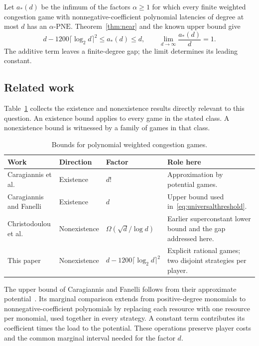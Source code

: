 \documentclass[11pt]{article}
\theoremstyle{definition}
\newcommand{\PNE}{\mathrm{PNE}}
\begin{document}
Let $a_*(d)$ be the infimum of the factors $\alpha\ge1$ for which every finite weighted congestion game with nonnegative-coefficient polynomial latencies of degree at most $d$ has an $\alpha$-$\PNE$. Theorem~\ref{thm:near} and the known upper bound give
\begin{equation}\label{eq:universalthreshold}
 d-1200\lceil\log_2d\rceil^2\le a_*(d)\le d,
 \qquad \lim_{d\to\infty}\frac{a_*(d)}d=1.
\end{equation}
The additive term leaves a finite-degree gap; the limit determines its leading constant.

\subsection{Related work}
Table~\ref{tab:related} collects the existence and nonexistence results directly relevant to this question. An existence bound applies to every game in the stated class. A nonexistence bound is witnessed by a family of games in that class.
\begin{table}[ht]
\centering\small
\caption{Bounds for polynomial weighted congestion games.}\label{tab:related}
\begin{tabularx}{\textwidth}{@{}>{\raggedright\arraybackslash}p{}>{\raggedright\arraybackslash}p{}>{\raggedright\arraybackslash}p{}>{\raggedright\arraybackslash}X@{}}
\toprule
Work & Direction & Factor & Role here\\
\midrule
Caragiannis et al.~\cite{CFGS2015} & Existence & $d!$ & Approximation by potential games.\\
Caragiannis and Fanelli~\cite{CF2021} & Existence & $d$ & Upper bound used in~\eqref{eq:universalthreshold}.\\
Christodoulou et al.~\cite{CGGPW2023} & Nonexistence & $\Omega(\sqrt d/\log d)$ & Earlier superconstant lower bound and the gap addressed here.\\
This paper & Nonexistence & $d-1200\lceil\log_2d\rceil^2$ & Explicit rational games; two disjoint strategies per player.\\
\bottomrule
\end{tabularx}
\end{table}

The upper bound of Caragiannis and Fanelli follows from their approximate potential~\cite[Theorem~2]{CF2021}. Its marginal comparison extends from positive-degree monomials to nonnegative-coefficient polynomials by replacing each resource with one resource per monomial, used together in every strategy. A constant term contributes its coefficient times the load to the potential. These operations preserve player costs and the common marginal interval needed for the factor $d$.
\end{document}

